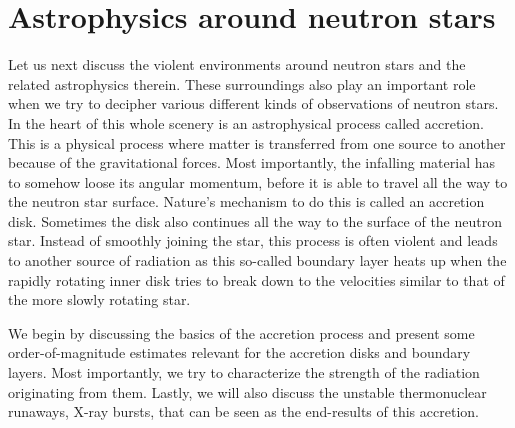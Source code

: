 \chapter{Astrophysics around neutron stars}

Let us next discuss the violent environments around neutron stars and the related astrophysics therein.
These surroundings also play an important role when we try to decipher various different kinds of observations of neutron stars.
In the heart of this whole scenery is an astrophysical process called accretion.
This is a physical process where matter is transferred from one source to another because of the gravitational forces.
Most importantly, the infalling material has to somehow loose its angular momentum, before it is able to travel all the way to the neutron star surface.
Nature's mechanism to do this is called an accretion disk.
Sometimes the disk also continues all the way to the surface of the neutron star.
Instead of smoothly joining the star, this process is often violent and leads to another source of radiation as this so-called boundary layer heats up when the rapidly rotating inner disk tries to break down to the velocities similar to that of the more slowly rotating star.



We begin by discussing the basics of the accretion process and present some order-of-magnitude estimates relevant for the accretion disks and boundary layers.
Most importantly, we try to characterize the strength of the radiation originating from them.
Lastly, we will also discuss the unstable thermonuclear runaways, X-ray bursts, that can be seen as the end-results of this accretion.

